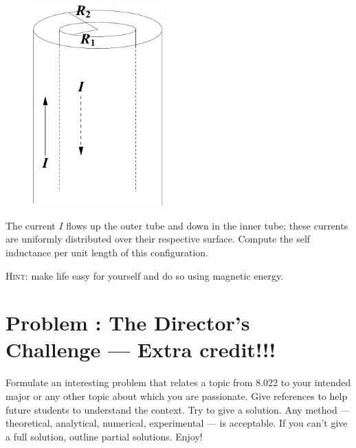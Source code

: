 \documentclass[problems]{esg8022pset}
\begin{document}
  \begin{figure}[H]
    \centering
    \includegraphics[width = 5cm]{coaxind}
    \label{fig:coax}
  \end{figure}

  The current $I$ flows up the outer tube and down in the
  inner tube; these currents are uniformly distributed over their
  respective surface.  Compute the self inductance per unit length of
  this configuration.

  \noindent \textsc{Hint}: make life easy for yourself and do so using
  magnetic energy.
\section{Problem \thesection: The Director's Challenge --- Extra credit!!!}
  Formulate an interesting problem that relates a topic from 8.022 to your
  intended major or any other topic about which you are passionate.  Give
  references to help future students to understand the context.  Try to give a
  solution.  Any method --- theoretical, analytical, numerical, experimental
  --- is acceptable.  If you can't give a full solution, outline partial
  solutions. Enjoy!
\end{document}
